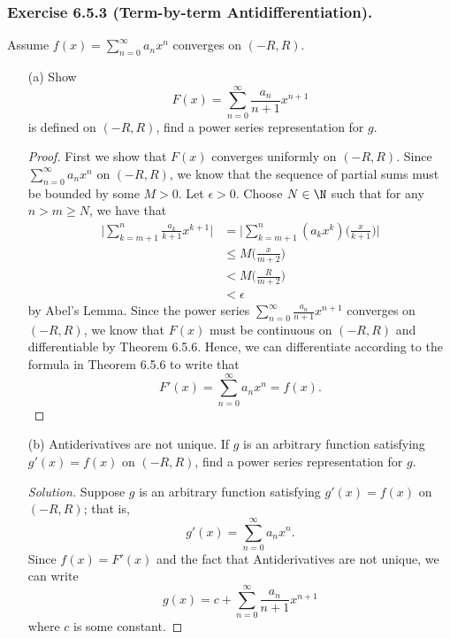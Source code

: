 \subsubsection{Exercise 6.5.3 (Term-by-term Antidifferentiation).} Assume \( f(x) = \sum_{ n=0  }^{  \infty  } a_n x^n  \) converges on \( (-R,R ) \). 
\begin{enumerate}
    \item[(a)] Show 
        \[  F(x) = \sum_{ n=0  }^{ \infty  } \frac{ a_n  }{  n + 1 } x^{n+1} \]
        is defined on \( (-R,R ) \), find a power series representation for \( g  \).
        \begin{proof}
            First we show that \( F(x)  \) converges uniformly on \( (-R,R ) \). Since \( \sum_{ n=0  }^{ \infty  } a_n x^n  \) on \( (-R ,R ) \), we know that the sequence of partial sums must be bounded by some \( M > 0  \). Let \( \epsilon > 0   \). Choose \( N \in \N  \) such that for any \(  n > m \geq N  \), we have that  
            \begin{align*}
                \Big| \sum_{ k = m +1  }^{  n } \frac{ a_k  }{  k +1  } x^{k+1} \Big| &= \Big| \sum_{ k= m+1  }^{ n } (a_k x^k) \Big( \frac{ x }{ k+1  }  \Big) \Big|  \\
                                                                                      &\leq M \Big( \frac{ x }{ m+2  }  \Big) \\
                                                                                      &< M \Big( \frac{ R  }{ m+2  }  \Big) \\
                                                                                      &< \epsilon
            \end{align*}
            by Abel's Lemma.
            Since the power series \( \sum_{ n=0  }^{ \infty  } \frac{ a_n  }{ n + 1  }  x^{n+1}  \) converges on \( (-R,R ) \), we know that \( F(x)  \) must be continuous on \( (-R ,R ) \) and differentiable by Theorem 6.5.6. Hence, we can differentiate according to the formula in Theorem 6.5.6 to write that \[  F'(x) = \sum_{ n=0  }^{ \infty  } a_n x^n = f(x). \]
        \end{proof}
    \item[(b)] Antiderivatives are not unique. If \( g  \) is an arbitrary function satisfying \( g'(x) = f(x)  \) on \( (-R,R ) \), find a power series representation for \( g  \).
        \begin{proof}[Solution]
        Suppose \( g  \) is an arbitrary function satisfying \( g'(x) = f(x)  \) on \( (-R ,R ) \); that is, 
        \[  g'(x) = \sum_{ n=0  }^{ \infty  } a_n x^n. \]
        Since \( f(x) = F'(x)  \) and the fact that Antiderivatives are not unique, we can write 
        \[  g(x) = c +  \sum_{ n=0  }^{ \infty  } \frac{ a_n  }{  n+1  } x^{n+1}\]
        where \( c  \) is some constant.
        \end{proof}
\end{enumerate} 



